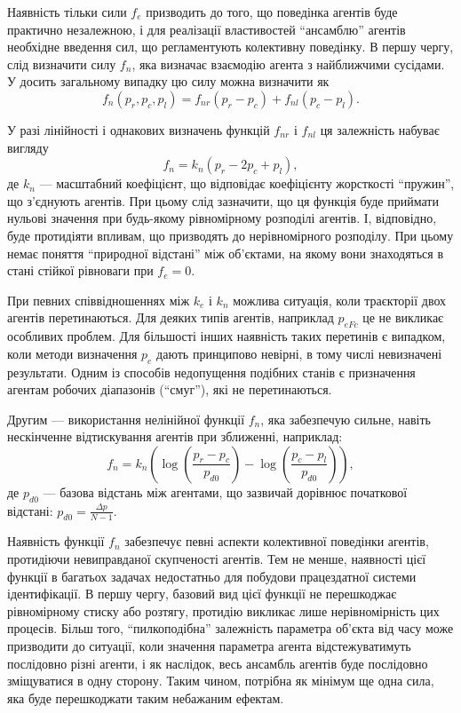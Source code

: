 Наявність тільки сили $f_e$ призводить до того, що поведінка агентів буде
практично незалежною, і для реалізації властивостей ``ансамблю'' агентів
необхідне введення сил, що регламентують колективну поведінку. В першу чергу,
слід визначити силу $f_n$, яка визначає взаємодію агента з найближчими
сусідами. У досить загальному випадку цю силу можна визначити як
%
\begin{equation}
  f_n( p_r, p_c, p_l ) = f_{nr}(p_r-p_c) + f_{nl}(p_c-p_l).
  \label{atu:eq:f_n_gen}
\end{equation}

У разі лінійності і однакових визначень функцій $f_{nr}$ і $f_{nl}$ ця залежність набуває вигляду
%
\begin{equation}
  f_n = k_n( p_r - 2 p_c + p_l ),
  \label{atu:eq:f_n_lin}
\end{equation}
%
де $k_n$ --- масштабний коефіцієнт, що відповідає коефіцієнту жорсткості
``пружин'', що з'єднують агентів. При цьому слід зазначити, що ця функція буде
приймати нульові значення при будь-якому рівномірному розподілі агентів.
І, відповідно, буде протидіяти впливам, що призводять до
нерівномірного розподілу. При цьому немає поняття ``природної відстані''
між об'єктами, на якому вони знаходяться в стані стійкої рівноваги при
$f_e = 0$.

При певних співвідношеннях між
$k_e$ і
$k_n$ можлива ситуація, коли траєкторії двох агентів
перетинаються. Для деяких типів агентів, наприклад
$p_{eFc}$ це не викликає особливих проблем. Для більшості інших
наявність таких перетинів є випадком, коли методи визначення
$p_e$ дають принципово невірні, в тому числі невизначені
результати. Одним із способів недопущення подібних станів є
призначення агентам робочих діапазонів (``смуг''), які не перетинаються.

Другим --- використання нелінійної функції $f_n$,
яка забезпечую сильне, навіть нескінченне відтискування
агентів при зближенні, наприклад:
%
\begin{equation}
  f_n = k_n \left( \log\left( \frac{p_r-p_c}{p_{d0}} \right) -  \log\left( \frac{p_c-p_l}{p_{d0}}\right) \right),
  \label{atu:eq:f_n_log}
\end{equation}
%
де
$p_{d0}$ ---
базова відстань між агентами, що зазвичай дорівнює початкової відстані:
$p_{d0} = \frac{\Delta p}{N-1}$.




Наявність функції
$f_n$ забезпечує певні аспекти колективної поведінки агентів,
протидіючи невиправданої скупченості агентів. Тем не менше,
наявності цієї функції в багатьох задачах недостатньо для
побудови працездатної системи ідентифікації. В першу чергу,
базовий вид цієї функції не перешкоджає рівномірному стиску
або розтягу, протидію викликає лише нерівномірність цих
процесів. Більш того, ``пилкоподібна'' залежність параметра
об'єкта від часу може призводити до ситуації, коли значення
параметра агента відстежуватимуть послідовно різні агенти, і
як наслідок, весь ансамбль агентів буде послідовно зміщуватися
в одну сторону. Таким чином, потрібна як мінімум ще одна сила,
яка буде перешкоджати таким небажаним ефектам.

